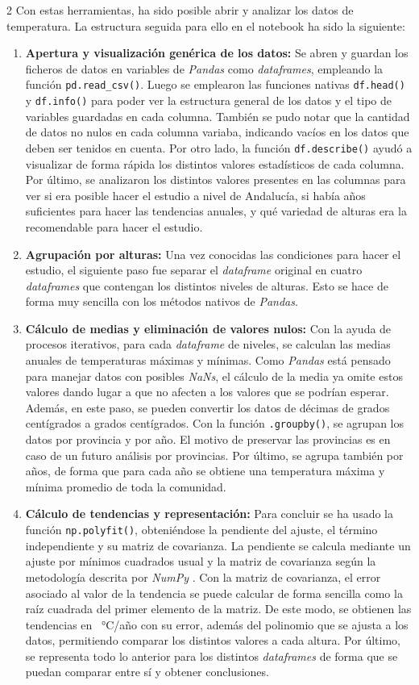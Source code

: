 \documentclass[a4paper]{article}
\numberwithin{equation}{section}
\begin{document}
\begin{multicols}{2}
	Con estas herramientas, ha sido posible abrir y analizar los datos de temperatura. La estructura seguida para ello en el notebook ha sido la siguiente:
	\begin{enumerate}
		\item \textbf{Apertura y visualización genérica de los datos:} Se abren y guardan los ficheros de datos en variables de \textit{Pandas} como \textit{dataframes}, empleando la función \verb|pd.read_csv()|. Luego se emplearon las funciones nativas \verb|df.head()| y \verb|df.info()| para poder ver la estructura general de los datos y el tipo de variables guardadas en cada columna. También se pudo notar que la cantidad de datos no nulos en cada columna variaba, indicando vacíos en los datos que deben ser tenidos en cuenta. Por otro lado, la función \verb|df.describe()| ayudó a visualizar de forma rápida los distintos valores estadísticos de cada columna. Por último, se analizaron los distintos valores presentes en las columnas para ver si era posible hacer el estudio a nivel de Andalucía, si había años suficientes para hacer las tendencias anuales, y qué variedad de alturas era la recomendable para hacer el estudio.
		\item \textbf{Agrupación por alturas:} Una vez conocidas las condiciones para hacer el estudio, el siguiente paso fue separar el \textit{dataframe} original en cuatro \textit{dataframes} que contengan los distintos niveles de alturas. Esto se hace de forma muy sencilla con los métodos nativos de \textit{Pandas}.
		\item \textbf{Cálculo de medias y eliminación de valores nulos:} Con la ayuda de procesos iterativos, para cada \textit{dataframe} de niveles, se calculan las medias anuales de temperaturas máximas y mínimas. Como \textit{Pandas} está pensado para manejar datos con posibles \textit{NaNs}, el cálculo de la media ya omite estos valores dando lugar a que no afecten a los valores que se podrían esperar. Además, en este paso, se pueden convertir los datos de décimas de grados centígrados a grados centígrados. Con la función \verb|.groupby()|, se agrupan los datos por provincia y por año. El motivo de preservar las provincias es en caso de un futuro análisis por provincias. Por último, se agrupa también por años, de forma que para cada año se obtiene una temperatura máxima y mínima promedio de toda la comunidad.
		\item \textbf{Cálculo de tendencias y representación:} Para concluir se ha usado la función \verb|np.polyfit()|, obteniéndose la pendiente del ajuste, el término independiente y su matriz de covarianza. La pendiente se calcula mediante un ajuste por mínimos cuadrados usual y la matriz de covarianza según la metodología descrita por \textit{NumPy} \cite{numpy_polyfit}. Con la matriz de covarianza, el error asociado al valor de la tendencia se puede calcular de forma sencilla como la raíz cuadrada del primer elemento de la matriz. De este modo, se obtienen las tendencias en \SI{}{\degreeCelsius}/año con su error, además del polinomio que se ajusta a los datos, permitiendo comparar los distintos valores a cada altura. Por último, se representa todo lo anterior para los distintos \textit{dataframes} de forma que se puedan comparar entre sí y obtener conclusiones.

\end{enumerate}
\end{multicols}
\end{document}
